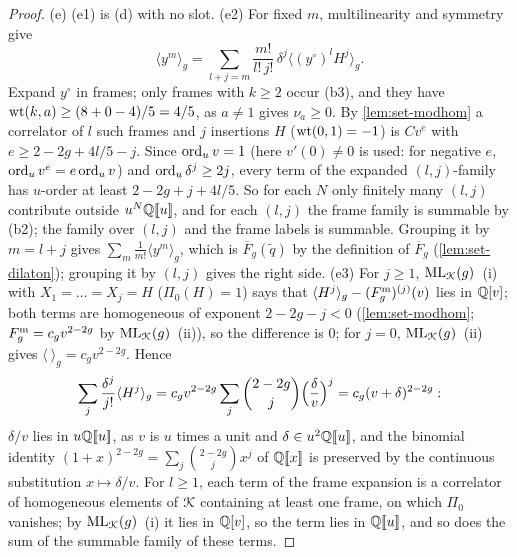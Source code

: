 \begin{proof}
(e) (e1) is (d) with no slot. (e2) For fixed $m$, multilinearity and symmetry give
\[
\langle y^m\rangle_g = \sum_{l+j=m}\frac{m!}{l!\,j!}\,\delta^j\langle(y^\circ)^lH^j\rangle_g .
\]
Expand $y^\circ$ in frames; only frames with $k\geq 2$ occur (b3), and they have $\operatorname{wt}(k,a)\geq(8+0-4)/5 = 4/5$, as $a\neq 1$ gives $\nu_a\geq 0$. By \cref{lem:set-modhom} a correlator of $l$ such frames and $j$ insertions $H$ ($\operatorname{wt}(0,1) = -1$) is $Cv^e$ with $e\geq 2-2g+4l/5-j$. Since $\operatorname{ord}_uv = 1$ (here $v'(0)\neq 0$ is used: for negative $e$, $\operatorname{ord}_uv^e = e\operatorname{ord}_uv$) and $\operatorname{ord}_u\delta^j\geq 2j$, every term of the expanded $(l,j)$-family has $u$-order at least $2-2g+j+4l/5$. So for each $N$ only finitely many $(l,j)$ contribute outside $u^N\mathbb{Q}[\![ u ]\!]$, and for each $(l,j)$ the frame family is summable by (b2); the family over $(l,j)$ and the frame labels is summable. Grouping it by $m = l+j$ gives $\sum_m\frac1{m!}\langle y^m\rangle_g$, which is $\overline F_g(\tilde q)$ by the definition of $\overline F_g$ (\cref{lem:set-dilaton}); grouping it by $(l,j)$ gives the right side. (e3) For $j\geq 1$, $\mathrm{ML}_{\mathcal{K}}(g)$~(i) with $X_1 = \dots = X_j = H$ ($\Pi_0(H) = 1$) says that $\langle H^j\rangle_g-(F^{\mathrm{m}}_g)^{(j)}(v)$ lies in $\mathbb{Q}[v]$; both terms are homogeneous of exponent $2-2g-j<0$ (\cref{lem:set-modhom}; $F^{\mathrm{m}}_g = c_gv^{2-2g}$ by $\mathrm{ML}_{\mathcal{K}}(g)$~(ii)), so the difference is $0$; for $j = 0$, $\mathrm{ML}_{\mathcal{K}}(g)$~(ii) gives $\langle\ \rangle_g = c_gv^{2-2g}$. Hence
\[
\sum_j\frac{\delta^j}{j!}\langle H^j\rangle_g = c_gv^{2-2g}\sum_j\binom{2-2g}{j}\Bigl(\frac{\delta}{v}\Bigr)^j = c_g(v+\delta)^{2-2g}:
\]
$\delta/v$ lies in $u\mathbb{Q}[\![ u ]\!]$, as $v$ is $u$ times a unit and $\delta\in u^2\mathbb{Q}[\![ u ]\!]$, and the binomial identity $(1+x)^{2-2g} = \sum_j\binom{2-2g}{j}x^j$ of $\mathbb{Q}[\![ x ]\!]$ is preserved by the continuous substitution $x\mapsto\delta/v$. For $l\geq 1$, each term of the frame expansion is a correlator of homogeneous elements of $\mathcal{K}$ containing at least one frame, on which $\Pi_0$ vanishes; by $\mathrm{ML}_{\mathcal{K}}(g)$~(i) it lies in $\mathbb{Q}[v]$, so the term lies in $\mathbb{Q}[\![ u ]\!]$, and so does the sum of the summable family of these terms.


\end{proof}
